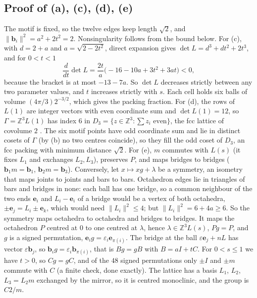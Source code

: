 \documentclass[11pt]{amsart}
\theoremstyle{definition}
\theoremstyle{remark}
\newcommand{\Z}{\mathbb{Z}}
\newcommand{\e}{\mathbf{e}}
\newcommand{\vb}{\mathbf{b}}
\newcommand{\norm}[1]{\lVert#1\rVert}
\begin{document}
\subsection{Proof of (a), (c), (d), (e)}
The motif is fixed, so the twelve edges keep length $\sqrt2$, and $\norm{\vb_i}^2=a^2+2t^2=2$. Nonsingularity follows from the bound below. For (c), with $d=2+a$ and $a=\sqrt{2-2t^2}$, direct expansion gives $\det L=d^3+dt^2+2t^3$, and for $0<t<1$
\[
\frac{d}{dt}\det L=\frac{2t}{a}\bigl(-16-10a+3t^2+3at\bigr)<0,
\]
because the bracket is at most $-13-7a$. So $\det L$ decreases strictly between any two parameter values, and $t$ increases strictly with $s$. Each cell holds six balls of volume $(4\pi/3)2^{-3/2}$, which gives the packing fraction. For (d), the rows of $L(1)$ are integer vectors with even coordinate sum and $\det L(1)=12$, so $\Gamma=\Z^3L(1)$ has index $6$ in $D_3=\{z\in\Z^3:\sum z_i\text{ even}\}$, the fcc lattice of covolume $2$ \cite{ConwaySloane1999}. The six motif points have odd coordinate sum and lie in distinct cosets of $\Gamma$ (by (b) no two centres coincide), so they fill the odd coset of $D_3$, an fcc packing with minimum distance $\sqrt2$. For (e), $m$ commutes with $L(s)$ (it fixes $L_1$ and exchanges $L_2,L_3$), preserves $P$, and maps bridges to bridges ($\vb_1m=\vb_1$, $\vb_2m=\vb_3$). Conversely, let $x\mapsto xg+\lambda$ be a symmetry, an isometry that maps joints to joints and bars to bars. Octahedron edges lie in triangles of bars and bridges in none: each ball has one bridge, so a common neighbour of the two ends $\e_i$ and $L_i-\e_i$ of a bridge would be a vertex of both octahedra, $\pm\e_j=L_i\pm\e_k$, which would need $\norm{L_i}^2\le4$; but $\norm{L_i}^2=6+4a\ge6$. So the symmetry maps octahedra to octahedra and bridges to bridges. It maps the octahedron $P$ centred at $0$ to one centred at $\lambda$, hence $\lambda\in\Z^3L(s)$, $Pg=P$, and $g$ is a signed permutation, $\e_ig=\varepsilon_i\e_{\pi(i)}$. The bridge at the ball $\varepsilon\e_j+nL$ has vector $\varepsilon\vb_j$, so $\vb_ig=\varepsilon_i\vb_{\pi(i)}$, that is $Bg=gB$ with $B=aI+tC$. For $0<s\le1$ we have $t>0$, so $Cg=gC$, and of the $48$ signed permutations only $\pm I$ and $\pm m$ commute with $C$ (a finite check, done exactly). The lattice has a basis $L_1$, $L_2$, $L_3=L_2m$ exchanged by the mirror, so it is centred monoclinic, and the group is $C2/m$.
\end{document}
